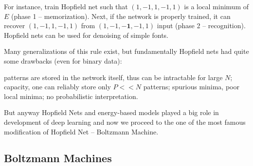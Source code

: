 \vspace{1em}
For instance, train Hopfield net such that $(1, -1, 1, -1, 1)$ is a local minimum of $E$ (phase 1 -- memorization). Next, if the network is properly trained, it can recover $(1, -1, 1, -1, 1)$ from $(1, -1, \mathbf{-1}, -1, 1)$ input (phase 2 -- recognition). Hopfield nets can be used for denoising of simple fonts.	

\vspace{1em}
Many generalizations of this rule exist, but fundamentally Hopfield nets had quite some drawbacks (even for binary data):
\begin{itemize}
\baditem patterns are stored in the network itself, thus can be intractable for large $N$;
\baditem capacity, one can reliably store only $P << N$ patterns;
\baditem spurious minima, poor local minima;
\baditem no probabilistic interpretation.
\end{itemize}
But anyway Hopfield Nets and energy-based models played a big role in development of deep learning and now we proceed to the one of the most famous modification of Hopfield Net -- Boltzmann Machine.

\subsection{Boltzmann Machines\cite{coursera_nn, aarts1988simulated, fischer2012introduction, tutorial2014lisa}}
